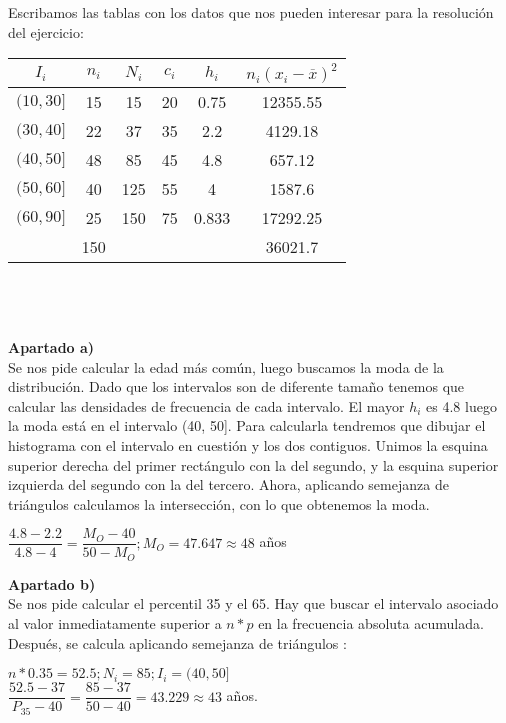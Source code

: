 Escribamos las tablas con los datos que nos pueden interesar para la resolución del ejercicio: \\

\begin{tabular}{| c | c | c | c | c | c |}
	\hline
	$I_i$   & $n_i$ &$N_i$&$c_i$&$h_i$ & $n_i(x_i-\overline{x})^2$ \\ \hline
	$(10, 30]$ & 15 & 15  & 20  & 0.75 & 12355.55\\
	$(30, 40]$ & 22 & 37  & 35  & 2.2  & 4129.18 \\
	$(40, 50]$ & 48 & 85  & 45  & 4.8  & 657.12  \\
	$(50, 60]$ & 40 & 125 & 55  & 4    & 1587.6  \\
	$(60, 90]$ & 25 & 150 & 75  & 0.833& 17292.25\\ \hline
	           & 150&     &     &      & 36021.7 \\ \hline
	
\end{tabular} \\\\\\

\textbf{Apartado a)}\\

Se nos pide calcular la edad más común, luego buscamos la moda de la distribución. Dado que los intervalos son de diferente tamaño tenemos que calcular las densidades de frecuencia de cada intervalo. El mayor $h_i$ es 4.8 luego la moda está en el intervalo (40, 50]. Para calcularla tendremos que dibujar el histograma con el intervalo en cuestión y los dos contiguos. Unimos la esquina superior derecha del primer rectángulo con la del segundo, y la esquina superior izquierda del segundo con la del tercero. Ahora, aplicando semejanza de triángulos calculamos la intersección, con lo que obtenemos la moda.
\begin{center}
	$\dfrac{4.8-2.2}{4.8-4} = \dfrac{M_O-40}{50-M_O}; M_O = 47.647 \approx 48$ años
\end{center}


\textbf{Apartado b)}\\

Se nos pide calcular el percentil 35 y el 65. Hay que buscar el intervalo asociado al valor inmediatamente superior a $n*p$ en la frecuencia absoluta acumulada. Después, se calcula aplicando semejanza de triángulos : \\


\begin{center}
	$n*0.35 = 52.5; N_i = 85; I_i = (40, 50]$\\
	$\dfrac{52.5-37}{P_{35}-40} = \dfrac{85-37}{50-40} = 43.229
	\approx 43$ años.
\end{center}

